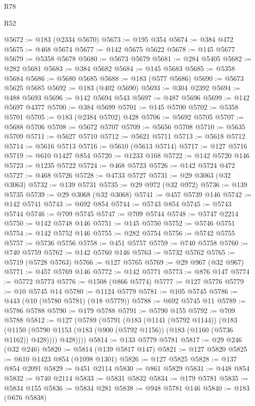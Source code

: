 \begin{lexlean}{R78}
\begin{lexlean}{R52}
\begin{coremodule}
{{{{{{{{{{{{{{{{{{{{{{{{{{{{{{{{{{{{{{{{{{{{{{{{{{{{{{{{{{{{{{{{{{{{{{{{{{{{{{{{{{{{{{{{{{{{{{{{{{{{{{{{{{{{{{{{{{{{{{{{{{{{{{{{{{{{{{{{{{{{{{{{{{{{{{{{{{{{{{{{{{{{{{{{{{{{{{{{{{{{{{{{{{{{{{{{{{{{{{@5672 := @183 (@2334 @5670)
@5673 := @195 @354
@5674 := @384 @472
@5675 := @468 @5674
@5677 := @142 @5675 @5622
@5678 := @145 @5677
@5679 := @5358 @5678
@5680 := @5673 @5679
@5681 := @284 @5405
@5682 := @282 @5681
@5683 := @384 @5682
@5684 := @145 @5683
@5685 := @5358 @5684
@5686 := @5680 @5685
@5688 := @183 (@577 @5686)
@5690 := @5673 @5625 @5685
@5692 := @183 (@402 @5690)
@5693 := @304 @2392
@5694 := @488 @5693
@5696 := @142 @5694 @543
@5697 := @487 @5696
@5699 := @142 @5697 @4377
@5700 := @384 @5699
@5701 := @145 @5700
@5702 := @5358 @5701
@5705 := @183 (@2384 @5702) @428
@5706 := @5692 @5705
@5707 := @5688 @5706
@5708 := @5672 @5707
@5709 := @5656 @5708
@5710 := @5635 @5709
@5711 := @5627 @5710
@5712 := @5621 @5711
@5713 := @5618 @5712
@5714 := @5616 @5713
@5716 := @5610 (@5613 @5714)
@5717 := @127 @5716
@5719 := @610 @1427 @854
@5720 := @1233 @168
@5722 := @142 @5720 @146
@5723 := @1235 @5722
@5724 := @468 @5723
@5726 := @142 @5724 @472
@5727 := @468 @5726
@5728 := @4733 @5727
@5731 := @29 @3063 (@32 @3063)
@5732 := @139 @5731
@5735 := @29 @972 (@32 @972)
@5736 := @139 @5735
@5739 := @29 @3068 (@32 @3068)
@5741 := @457 @5739 @146
@5742 := @142 @5741
@5743 := @692 @854
@5744 := @5743 @854
@5745 := @5743 @5744
@5746 := @709 @5745
@5747 := @709 @5744
@5748 := @5747 @2214
@5750 := @142 @5748 @146
@5751 := @145 @5750
@5752 := @5746 @5751
@5754 := @142 @5752 @146
@5755 := @282 @5754
@5756 := @5742 @5755
@5757 := @5736 @5756
@5758 := @451 @5757
@5759 := @740 @5758
@5760 := @740 @5759
@5762 := @142 @5760 @146
@5763 := @5732 @5762
@5765 := @5719 (@5728 @5763)
@5766 := @127 @5765
@5769 := @29 @967 (@32 @967)
@5771 := @457 @5769 @146
@5772 := @142 @5771
@5773 := @876 @147
@5774 := @5772 @5773
@5776 := @1508 (@866 @5774)
@5777 := @127 @5776
@5779 := @10 @5745 @14
@5780 := @1124 @5779
@5781 := @105 @5745
@5786 := @443 (@10 (@5780 @5781) (@18 @5779))
@5788 := @692 @5745 @11
@5789 := @5786 @5788
@5790 := @179 @5788
@5791 := @5790 @155
@5792 := @709 @5788
@5812 := @127
    (@5789
      (@5791
        (@183
          (@1141 (@5792 @1144))
          (@183
            (@1150 (@5790 @1153 (@183 (@900 (@5792 @1156)) (@183 (@1160 (@5736 @1162)) @428))))
            @428))))
@5814 := @133 @5779 @5781
@5817 := @29 @246 (@32 @246)
@5820 := @5814 (@139 @5817 @147)
@5821 := @127 @5820
@5825 := @610 @1423 @854 (@1098 @1301)
@5826 := @127 @5825
@5828 := @137 @854 @2091
@5829 := @451 @2114
@5830 := @861 @5829
@5831 := @448 @854
@5832 := @740 @2114
@5833 := @5831 @5832
@5834 := @179 @5781
@5835 := @5834 @155
@5836 := @5834 @281
@5838 := @948 @5781 @146
@5840 := @183 (@676 @5838)
}}}}}}}}}}}}}}}}}}}}}}}}}}}}}}}}}}}}}}}}}}}}}}}}}}}}}}}}}}}}}}}}}}}}}}}}}}}}}}}}}}}}}}}}}}}}}}}}}}}}}}}}}}}}}}}}}}}}}}}}}}}}}}}}}}}}}}}}}}}}}}}}}}}}}}}}}}}}}}}}}}}}}}}}}}}}}}}}}}}}}}}}}}}}}}}}}}}}}}
\end{coremodule}
\end{lexlean}
\end{lexlean}

